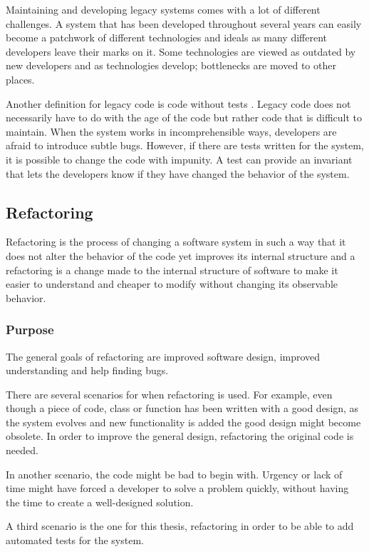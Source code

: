\documentclass{article}
\begin{document}
		Maintaining and developing legacy systems comes with a lot of different challenges. A system that has been developed throughout several years can easily become a patchwork of different technologies and ideals as many different developers leave their marks on it. Some technologies are viewed as outdated by new developers and as technologies develop; bottlenecks are moved to other places.

		Another definition for legacy code is code without tests \cite{legacy}. Legacy code does not necessarily have to do with the age of the code but rather code that is difficult to maintain. When the system works in incomprehensible ways, developers are afraid to introduce subtle bugs. However, if there are tests written for the system, it is possible to change the code with impunity. A test can provide an invariant that lets the developers know if they have changed the behavior of the system.

		\subsection{Refactoring}
		Refactoring is the process of changing a software system in such a way that it does not alter the behavior of the code yet improves its internal structure and a refactoring is a change made to the internal structure of software to make it easier to understand and cheaper to modify without changing its observable behavior. \cite{refactor}

			\subsubsection{Purpose}
			The general goals of refactoring are improved software design, improved understanding and help finding bugs.

			There are several scenarios for when refactoring is used. For example, even though a piece of code, class or function has been written with a good design, as the system evolves and new functionality is added the good design might become obsolete. In order to improve the general design, refactoring the original code is needed.

			In another scenario, the code might be bad to begin with. Urgency or lack of time might have forced a developer to solve a problem quickly, without having the time to create a well-designed solution.

			A third scenario is the one for this thesis, refactoring in order to be able to add automated tests for the system.
\end{document}
